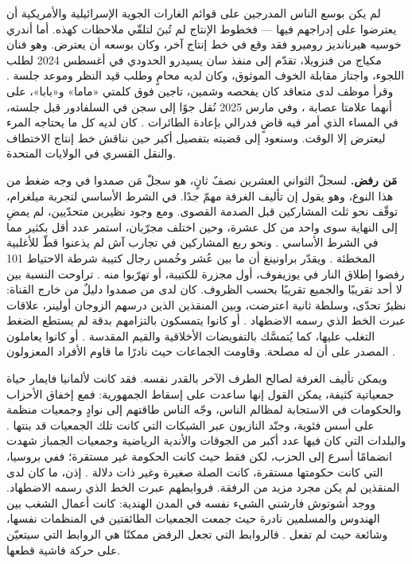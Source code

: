 لم يكن بوسع الناس المدرجين على قوائم الغارات الجوية الإسرائيلية والأمريكية أن يعترضوا على إدراجهم فيها — فخطوط الإنتاج لم تُبنَ لتلقّي ملاحظات كهذه. أما أندري خوسيه هيرنانديز روميرو فقد وقع في خط إنتاج آخر، وكان بوسعه أن يعترض. وهو فنان مكياج من فنزويلا، تقدّم إلى منفذ سان يسيدرو الحدودي في أغسطس 2024 لطلب اللجوء، واجتاز مقابلة الخوف الموثوق، وكان لديه محامٍ وطلب قيد النظر وموعد جلسة \autocite{LULAC2025HernandezRomero,Vega2025HernandezRomero}. وقرأ موظف لدى متعاقد كان يفحصه وشمين، تاجين فوق كلمتي «ماما» و«بابا»، على أنهما علامتا عصابة \autocite{Palomera2025Blade}، وفي مارس 2025 نُقل جوًا إلى سجن في السلفادور قبل جلسته، في المساء الذي أمر فيه قاضٍ فدرالي بإعادة الطائرات \autocite{jgg2025contempt}. كان لديه كل ما يحتاجه المرء ليعترض إلا الوقت. وسنعود إلى قضيته بتفصيل أكبر حين نناقش خط إنتاج الاختطاف والنقل القسري في الولايات المتحدة.

\textbf{مَن رفض.} لسجلّ الثواني العشرين نصفٌ ثانٍ، هو سجلّ مَن صمدوا في وجه ضغط من هذا النوع، وهو يقول إن تأليف الغرفة مهمّ جدًا. في الشرط الأساسي لتجربة ميلغرام، توقّف نحو ثلث المشاركين قبل الصدمة القصوى. ومع وجود نظيرين متحدّيين، لم يمضِ إلى النهاية سوى واحد من كل عشرة، وحين اختلف مجرّبان، استمر عدد أقل بكثير مما في الشرط الأساسي \autocite{milgram1974obedience}. ونحو ربع المشاركين في تجارب آش لم يذعنوا قطّ للأغلبية المخطئة \autocite{asch1956studies}. ويقدّر براونينغ أن ما بين عُشر وخُمس رجال كتيبة شرطة الاحتياط 101 رفضوا إطلاق النار في يوزيفوف، أول مجزرة للكتيبة، أو تهرّبوا منه \autocite{browning1992ordinary}. تراوحت النسبة بين لا أحد تقريبًا والجميع تقريبًا بحسب الظروف. كان لدى من صمدوا دليلٌ من خارج القناة: نظيرٌ تحدّى، وسلطة ثانية اعترضت، وبين المنقذين الذين درسهم الزوجان أولينر، علاقات عبرت الخط الذي رسمه الاضطهاد \autocite{oliner1988altruistic}. أو كانوا يتمسكون بالتزامهم بدقة لم يستطع الضغط التغلب عليها، كما يُتمسَّك بالتفويضات الأخلاقية والقيم المقدسة \autocite{skitka2009limits,ginges2007sacred}. أو كانوا يعاملون المصدر على أن له مصلحة. وقاومت الجماعات حيث نادرًا ما قاوم الأفراد المعزولون \autocite{gamson1982encounters}.

ويمكن تأليف الغرفة لصالح الطرف الآخر بالقدر نفسه. فقد كانت لألمانيا فايمار حياة جمعياتية كثيفة، يمكن القول إنها ساعدت على إسقاط الجمهورية: فمع إخفاق الأحزاب والحكومات في الاستجابة لمظالم الناس، وجّه الناس طاقتهم إلى نوادٍ وجمعيات منظمة على أسس فئوية، وجنّد النازيون عبر الشبكات التي كانت تلك الجمعيات قد بنتها \autocite{berman1997weimar}. والبلدات التي كان فيها عدد أكبر من الجوقات والأندية الرياضية وجمعيات الجمباز شهدت انضمامًا أسرع إلى الحزب، لكن فقط حيث كانت الحكومة غير مستقرة؛ ففي بروسيا، التي كانت حكومتها مستقرة، كانت الصلة صغيرة وغير ذات دلالة \autocite{satyanath2017bowling}. إذن، ما كان لدى المنقذين لم يكن مجرد مزيد من الرفقة. فروابطهم عبرت الخط الذي رسمه الاضطهاد. ووجد أشوتوش فارشني الشيء نفسه في المدن الهندية: كانت أعمال الشغب بين الهندوس والمسلمين نادرة حيث جمعت الجمعيات الطائفتين في المنظمات نفسها، وشائعة حيث لم تفعل \autocite{varshney2002ethnic}. فالروابط التي تجعل الرفض ممكنًا هي الروابط التي سيتعيّن على حركة فاشية قطعها.


